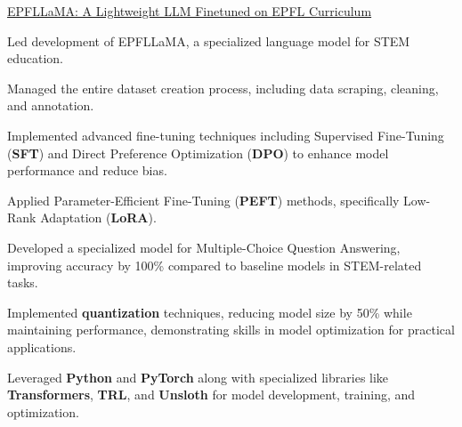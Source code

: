 
\begin{rSubsection}
{\href{https://github.com/AliBakly/EPFLLaMA}{\underline{EPFLLaMA: A Lightweight LLM Finetuned on EPFL Curriculum} \href{Project Link}{\raisebox{-0.1\height}\faExternalLink }}}{}{}{}{}{}{}

\item Led development of EPFLLaMA, a specialized language model for STEM education.
\item Managed the entire dataset creation process, including data scraping, cleaning, and annotation.
\item Implemented advanced fine-tuning techniques including Supervised Fine-Tuning (\textbf{SFT}) and Direct Preference Optimization (\textbf{DPO}) to enhance model performance and reduce bias.
\item Applied Parameter-Efficient Fine-Tuning (\textbf{PEFT}) methods, specifically Low-Rank Adaptation (\textbf{LoRA}).%
\item Developed a specialized model for Multiple-Choice Question Answering, improving accuracy by 100\% compared to baseline models in STEM-related tasks.
\item Implemented \textbf{quantization} techniques, reducing model size by 50\% while maintaining performance, demonstrating skills in model optimization for practical applications.
\item Leveraged \textbf{Python} and \textbf{PyTorch} along with specialized libraries like \textbf{Transformers}, \textbf{TRL}, and \textbf{Unsloth} for model development, training, and optimization.
\end{rSubsection}
\vspace{-8pt}